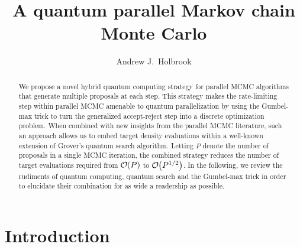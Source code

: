 \documentclass[12pt]{article} %
\title{A quantum parallel Markov chain Monte Carlo}
\date{}
\author{Andrew J.~Holbrook}
\affil{UCLA Biostatistics}
\newcommand{\order}[1]{{\cal O}\hspace{-0.2em}\left( #1 \right)}
\begin{document}
\maketitle




\begin{abstract}

We propose a novel hybrid quantum computing strategy for parallel MCMC algorithms that generate multiple proposals at each step. This strategy makes the rate-limiting step within parallel MCMC amenable to quantum parallelization by using the Gumbel-max trick to turn the generalized accept-reject step into a discrete optimization problem.  When combined with new insights from the parallel MCMC literature, such an approach allows us to embed target density evaluations within a well-known extension of Grover's quantum search algorithm.  Letting $P$ denote the number of proposals in a single MCMC iteration, the combined strategy reduces the number of target evaluations required from $\order{P}$ to $\order{P^{1/2}}$.  In the following, we review the rudiments of quantum computing, quantum search and the Gumbel-max trick in order to elucidate their combination for as wide a readership as possible. 


\end{abstract}


\section{Introduction}\label{sec:intro}

\newcommand{\ttheta}{\boldsymbol{\theta}}
\newcommand{\Ttheta}{\boldsymbol{\Theta}}
\newcommand{\dd}{\mbox{d}}
\newcommand{\ppsi}{\boldsymbol{\psi}}
\newcommand{\U}{\mathbf{U}}
\newcommand{\I}{\mathbf{I}}
\renewcommand{\H}{\mathbf{H}}
\newcommand{\A}{\mathbf{A}}
\newcommand{\B}{\mathbf{B}}
\newcommand{\G}{\mathbf{G}}
\newcommand{\ppi}{\boldsymbol{\pi}}
\newcommand{\llambda}{\boldsymbol{\lambda}}
\end{document}
